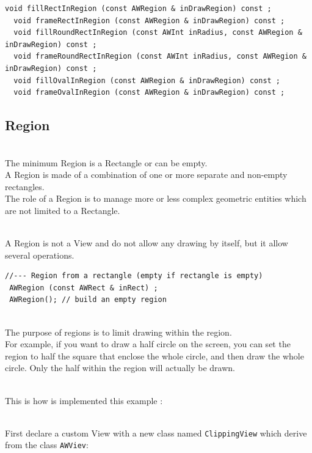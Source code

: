 \documentclass[a4paper,11pt]{extarticle}
\begin{document}
\begin{lstlisting}[language=Arduinonl]
  void fillRectInRegion (const AWRegion & inDrawRegion) const ;
  void frameRectInRegion (const AWRegion & inDrawRegion) const ;
  void fillRoundRectInRegion (const AWInt inRadius, const AWRegion & inDrawRegion) const ;
  void frameRoundRectInRegion (const AWInt inRadius, const AWRegion & inDrawRegion) const ;
  void fillOvalInRegion (const AWRegion & inDrawRegion) const ;
  void frameOvalInRegion (const AWRegion & inDrawRegion) const ;
\end{lstlisting}

\newpage
\subsection{Region}

~\\ The minimum Region is a Rectangle or can be empty.
~\\ A Region is made of a combination of one or more separate and non-empty rectangles.
~\\ The role of a Region is to manage more or less complex geometric entities which are not limited to a Rectangle.

~\\ A Region is not a View and do not allow any drawing by itself, but it allow several operations.

\begin{lstlisting}[language=Arduinonl]
//--- Region from a rectangle (empty if rectangle is empty)
 AWRegion (const AWRect & inRect) ; 
 AWRegion(); // build an empty region
\end{lstlisting}
  
~\\ The purpose of regions is to limit drawing within the region. 
~\\ For example, if you want to draw a half circle on the screen, you can set the region to half the square that enclose the whole circle, and then draw the whole circle. Only the half within the region will actually be drawn.

~\\ This is how is implemented this example :

~\\ First declare a custom View with a new class named \texttt{ClippingView} which derive from the class \texttt{AWViev}:
\end{document}
